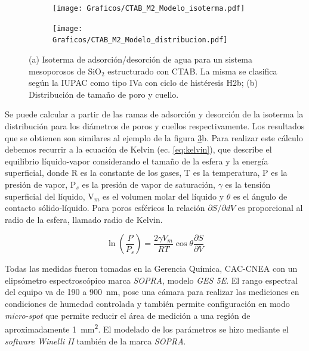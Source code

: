 			\begin{figure}[!ht]
		     	  		\begin{subfigure}[t]{0.491\textwidth}
		     	  		\texttt{[image: Graficos/CTAB\_M2\_Modelo\_isoterma.pdf]}
						\label{fig:pea_ej1}
						\end{subfigure}
						\begin{subfigure}[t]{0.495\textwidth}
		     	  		\texttt{[image: Graficos/CTAB\_M2\_Modelo\_distribucion.pdf]}
						\label{fig:pea_ej2}
						\end{subfigure}
						\vspace*{-0.6cm}
						\caption[Isoterma de adsorción/desorción tipo IVa, H2b.]{(a) Isoterma de adsorción/desorción de agua para un sistema mesoporosos de SiO$_2$ estructurado con CTAB. La misma se clasifica según la IUPAC como tipo IVa con ciclo de histéresis H2b; (b) Distribución de tamaño de poro y cuello.}
						\label{fig:pea_ej}
						\end{figure}			
		\vspace{0.3cm}				
		Se puede calcular a partir de las ramas de adsorción y desorción de la isoterma la distribución para los diámetros de poros y cuellos respectivamente. Los resultados que se obtienen son similares al ejemplo de la figura \ref{fig:pea_ej}b. Para realizar este cálculo debemos recurrir a la ecuación de Kelvin (ec. \ref{eq:kelvin}), que describe el equilibrio líquido-vapor considerando el tamaño de la esfera y la energía superficial, donde R es la constante de los gases, T es la temperatura, P es la presión de vapor, P$_s$ es la presión de vapor de saturación, $\gamma$ es la tensión superficial del líquido, V$_m$ es el volumen molar del líquido y $\theta$ es el ángulo de contacto sólido-líquido. \cite{Baklanov2000,Boissiere2005,Sing1985} Para poros esféricos la relación $\partial S/ \partial dV$ es proporcional al radio de la esfera, llamado radio de Kelvin.\cite{FernandezPrini2005}
		
			\begin{equation}
			  	 \ln \left(\frac{P}{P_s}\right)=\frac{2\gamma V_m}{RT} \cos{\theta}\frac{\partial S}{\partial V}
			     \label{eq:kelvin}
			 	 \end{equation}					
	
		Todas las medidas fueron tomadas en la Gerencia Química, CAC-CNEA con un elipsómetro espectroscópico marca \textit{SOPRA}, modelo \textit{GES 5E}. El rango espectral del equipo va de 190 a \SI{900}{\nm}, pose una cámara para realizar las mediciones en condiciones de humedad controlada y también permite configuración en modo \textit{micro-spot} que permite reducir el área de medición a una región de aproximadamente \SI{1}{\mm^2}. El modelado de los parámetros se hizo mediante el \textit{software Winelli II} también de la marca \textit{SOPRA}.
			
